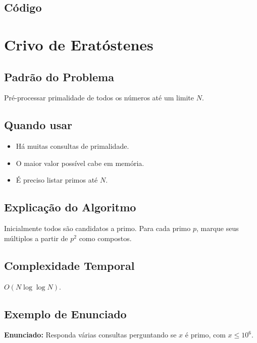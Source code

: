 \subsection{Código}

\section{Crivo de Eratóstenes}

\subsection{Padrão do Problema}
Pré-processar primalidade de todos os números até um limite $N$.

\subsection{Quando usar}
\begin{itemize}[nosep]
  \item Há muitas consultas de primalidade.
  \item O maior valor possível cabe em memória.
  \item É preciso listar primos até $N$.
\end{itemize}

\subsection{Explicação do Algoritmo}
Inicialmente todos são candidatos a primo. Para cada primo $p$, marque seus múltiplos a partir de $p^2$ como compostos.

\subsection{Complexidade Temporal}
$O(N \log\log N)$.

\subsection{Exemplo de Enunciado}
\begin{exemplodiabox}
\textbf{Enunciado:} Responda várias consultas perguntando se $x$ é primo, com $x \leq 10^6$.
\end{exemplodiabox}


